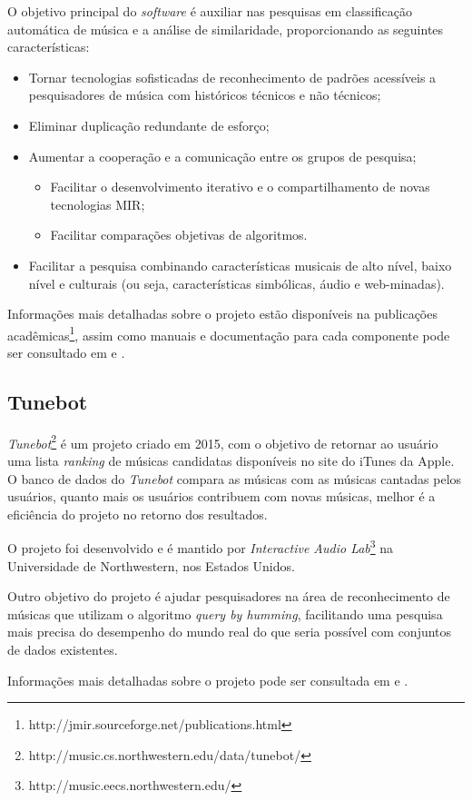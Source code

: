 O objetivo principal do \textit{software} é auxiliar nas pesquisas em classificação automática de música e a análise de similaridade, proporcionando as seguintes características:

\begin{itemize}
    \item Tornar tecnologias sofisticadas de reconhecimento de padrões acessíveis a pesquisadores de música com históricos técnicos e não técnicos;
    \item Eliminar duplicação redundante de esforço;
    \item Aumentar a cooperação e a comunicação entre os grupos de pesquisa;
    \begin{itemize}
        \item Facilitar o desenvolvimento iterativo e o compartilhamento de novas tecnologias MIR;
        \item Facilitar comparações objetivas de algoritmos.
    \end{itemize}
    \item Facilitar a pesquisa combinando características musicais de alto nível, baixo nível e culturais (ou seja, características simbólicas, áudio e web-minadas).
\end{itemize}

Informações mais detalhadas sobre o projeto estão disponíveis na publicações acadêmicas\footnote{http://jmir.sourceforge.net/publications.html}, assim como manuais e documentação para cada componente pode ser consultado em \cite{jmir} e \cite{mckay2010}.

\subsection{Tunebot}
\textit{Tunebot}\footnote{http://music.cs.northwestern.edu/data/tunebot/} é um projeto criado em 2015, com o objetivo de retornar ao usuário uma lista \textit{ranking} de músicas candidatas disponíveis no site do iTunes da Apple. O banco de dados do \textit{Tunebot} compara as músicas com as músicas cantadas pelos usuários, quanto mais os usuários contribuem com novas músicas, melhor é a eficiência do projeto no retorno dos resultados.

O projeto foi desenvolvido e é mantido por \textit{Interactive Audio Lab}\footnote{http://music.eecs.northwestern.edu/} na Universidade de Northwestern, nos Estados Unidos.

Outro objetivo do projeto é ajudar pesquisadores na área de reconhecimento de músicas que utilizam o algoritmo \textit{query by humming}, facilitando uma pesquisa mais precisa do desempenho do mundo real do que seria possível com conjuntos de dados existentes.

Informações mais detalhadas sobre o projeto pode ser consultada em \cite{pardo2012} e \cite{huq2010}.
